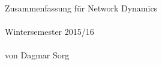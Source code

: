 \begin{titlepage}
	\phantom{text}\vfill
	\begin{center}
		\Huge{Zusammenfassung für Network Dynamics}\\\ \\
		\Large{Wintersemester 2015/16}\\\ \\
		\large{von Dagmar Sorg}
	\end{center}
	\vfill	\phantom{text}
	\end{titlepage}